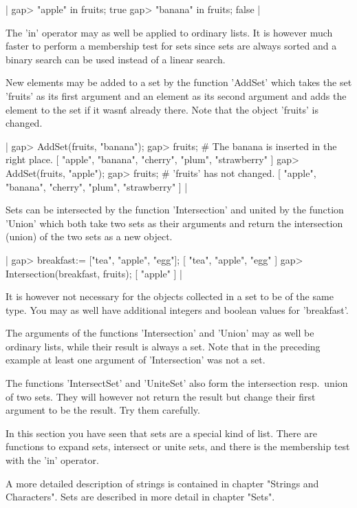 |    gap> "apple" in fruits;
    true
    gap> "banana" in fruits;
    false |

The  'in' operator may  as  well  be  applied  to ordinary lists.  It  is
however  much faster to perform a membership test for sets since sets are
always sorted and a binary search can be used instead of a linear search.

New elements may be added to  a set by the  function 'AddSet' which takes
the set 'fruits'   as its first argument  and  an element  as its  second
argument and adds  the element to  the set  if it wasn\'t  already there.
Note that the object 'fruits' is changed.

|    gap> AddSet(fruits, "banana");
    gap> fruits;        #  The banana is inserted in the right place.
    [ "apple", "banana", "cherry", "plum", "strawberry" ]
    gap> AddSet(fruits, "apple");
    gap> fruits;        #  'fruits' has not changed.
    [ "apple", "banana", "cherry", "plum", "strawberry" ] |

Sets can be intersected by the function 'Intersection'  and united by the
function 'Union' which both take  two sets as their arguments  and return
the intersection (union) of the two sets as a new object.

|    gap> breakfast:= ["tea", "apple", "egg"];
    [ "tea", "apple", "egg" ]
    gap> Intersection(breakfast, fruits);
    [ "apple" ] |

It is however not  necessary for the objects collected in a set to be  of
the same type.  You  may  as well  have additional  integers  and boolean
values for 'breakfast'.

The arguments of the functions 'Intersection' and 'Union' may  as well be
ordinary lists, while their  result is always  a set.  Note  that in  the
preceding example at least one argument of 'Intersection' was not a set.

The  functions  'IntersectSet' and  'UniteSet' also form the intersection
resp.~union of  two sets.  They will however  not return  the result  but
change their first argument to be the result.  Try them carefully.

In this  section you have  seen  that  sets  are a  special kind of list.
There are functions to expand sets, intersect or unite sets, and there is
the membership test with the 'in' operator.

A more detailed  description of strings is contained in chapter  "Strings
and Characters".  Sets are described in more detail in chapter "Sets".

